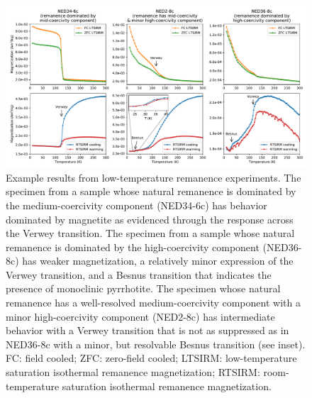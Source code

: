 \documentclass[draft]{agujournal2019}
\begin{document}
\begin{figure}[!ht]
\noindent\includegraphics[width=\textwidth]{./figures/paleomag_MPMS_data.pdf}
\caption{\small{Example results from low-temperature remanence experiments. The specimen from a sample whose natural remanence is dominated by the medium-coercivity component (NED34-6c) has behavior dominated by magnetite as evidenced through the response across the Verwey transition. The specimen from a sample whose natural remanence is dominated by the high-coercivity component (NED36-8c) has weaker magnetization, a relatively minor expression of the Verwey transition, and a Besnus transition that indicates the presence of monoclinic pyrrhotite. The specimen whose natural remanence has a well-resolved medium-coercivity component with a minor high-coercivity component (NED2-8c) has intermediate behavior with a Verwey transition that is not as suppressed as in NED36-8c with a minor, but resolvable Besnus transition (see inset). FC: field cooled; ZFC: zero-field cooled; LTSIRM: low-temperature saturation isothermal remanence magnetization; RTSIRM: room-temperature saturation isothermal remanence magnetization.}}
\label{fig:MPMS_data}
\end{figure}
\end{document}

